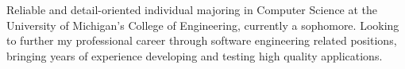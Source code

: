 \documentclass[letter,10pt]{article}
\begin{document}


\text Reliable and detail-oriented individual majoring in Computer Science at the University of Michigan's College of Engineering, currently a sophomore. Looking to further my professional career through software engineering related positions, bringing years of experience developing and testing high quality applications.
\end{document}
